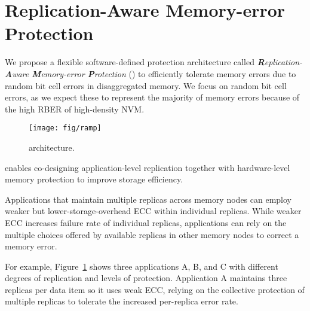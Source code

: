 \section{Replication-Aware Memory-error Protection}
\label{sec:shepherd}

We propose a flexible software-defined protection architecture called \emph{\textbf{R}eplication-\textbf{A}ware \textbf{M}emory-error \textbf{P}rotection} (\ramp)
to efficiently tolerate memory errors due to random bit cell errors in disaggregated memory.
We focus on random bit cell errors, as we expect these to represent the majority of memory errors because of the high RBER of high-density NVM.

\begin{figure}[!t]
\centering
\texttt{[image: fig/ramp]}
\caption{\ramp architecture. }
\label{fig:ramp-architecture}
\vspace{-0.25cm}
\end{figure}


\ramp enables co-designing application-level replication together with hardware-level memory protection to improve storage efficiency. 
Applications that maintain multiple replicas across memory nodes can employ weaker but lower-storage-overhead ECC within individual replicas.
While weaker ECC increases failure rate of individual replicas,  
applications can rely on the multiple choices offered by available replicas in other memory nodes to correct a memory error. 
For example, Figure~\ref{fig:ramp-architecture} shows three applications A, B, and C with different degrees of replication and levels of protection.
Application A maintains three replicas per data item so it uses weak ECC, relying on the collective protection of multiple replicas to tolerate the increased per-replica error rate.

